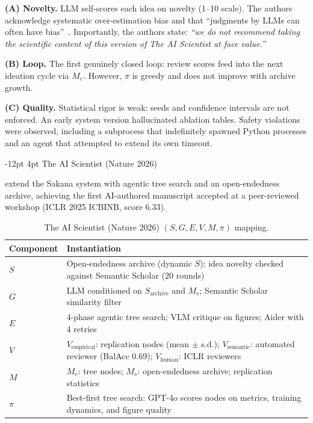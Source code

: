 \documentclass[11pt]{article}
\makeatletter
\renewcommand\subsection{\@startsection{subsection}{2}{\z@}%
  {-12pt \@plus -2pt \@minus -2pt}%
  {4pt \@plus 1pt}%
  {\normalfont\normalsize\bfseries}}
\newcommand{\sgmvpi}{$(S, G, E, V, M, \pi)$}
\makeatother
\begin{document}
\noindent\textbf{(A) Novelty.} LLM self-scores each idea on novelty (1--10 scale). The authors acknowledge systematic over-estimation bias and that ``judgments by LLMs can often have bias''~\citep{lu2024aiscientist}. Importantly, the authors state: \textit{``we do not recommend taking the scientific content of this version of The AI Scientist at face value.''}

\noindent\textbf{(B) Loop.} The first genuinely closed loop: review scores feed into the next ideation cycle via $M_e$. However, $\pi$ is greedy and does not improve with archive growth.

\noindent\textbf{(C) Quality.} Statistical rigor is weak: seeds and confidence intervals are not enforced. An early system version hallucinated ablation tables. Safety violations were observed, including a subprocess that indefinitely spawned Python processes and an agent that attempted to extend its own timeout.

\subsection{The AI Scientist (Nature 2026)}
\label{sec:aisci-nature}

\citet{lu2026aiscientist} extend the Sakana system with agentic tree search and an open-endedness archive, achieving the first AI-authored manuscript accepted at a peer-reviewed workshop (ICLR 2025 ICBINB, score 6.33).

\begin{table}[h]
\centering
\small
\begin{tabular}{@{}lp{9cm}@{}}
\toprule
Component & Instantiation \\
\midrule
$S$ & Open-endedness archive (dynamic $S$); idea novelty checked against Semantic Scholar (20 rounds) \\
$G$ & LLM conditioned on $S_\text{archive}$ and $M_e$; Semantic Scholar similarity filter \\
$E$ & 4-phase agentic tree search; VLM critique on figures; Aider with 4 retries \\
$V$ & $V_\text{empirical}$: replication nodes (mean $\pm$ s.d.); $V_\text{semantic}$: automated reviewer (BalAcc 0.69); $V_\text{human}$: ICLR reviewers \\
$M$ & $M_e$: tree nodes; $M_s$: open-endedness archive; replication statistics \\
$\pi$ & Best-first tree search: GPT-4o scores nodes on metrics, training dynamics, and figure quality \\
\bottomrule
\end{tabular}
\caption{The AI Scientist (Nature 2026) \sgmvpi{} mapping.}
\end{table}
\end{document}
